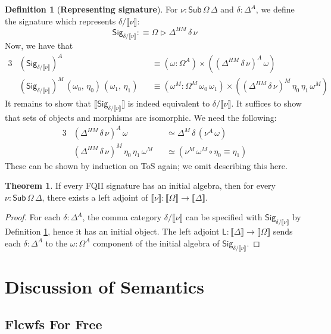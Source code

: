\documentclass[12pt,a4paper,twoside,openany]{book}
\theoremstyle{remark}
\theoremstyle{definition}
\newtheorem{mydefinition}{Definition}
\theoremstyle{theorem}
\newtheorem{theorem}{Theorem}
\newcommand{\ms}[1]{\mathsf{#1}}
\newcommand{\Sub}{\mathsf{Sub}}
\newcommand{\ext}{\triangleright}
\newcommand{\llb}{\llbracket}
\newcommand{\rrb}{\rrbracket}
\newcommand{\sem}[1]{\llb#1\rrb}
\newcommand{\defn}{:\equiv}
\begin{document}
\begin{mydefinition}[\textbf{Representing signature}]
\label{def:fqii-rep-signature}
\noindent For $\nu : \Sub\,\Omega\,\Delta$ and $\delta : \Delta^A$, we define the
signature which represents $\delta/\sem{\nu}$:
\[
  \ms{Sig}_{\delta/\sem{\nu}} \defn \Omega \ext \Delta^{HM}\,\delta\,\nu
\]
Now, we have that
\begin{alignat*}{3}
  &(\ms{Sig}_{\delta/\sem{\nu}})^A &&\equiv (\omega : \Omega^A) \times ((\Delta^{HM}\,\delta\,\nu)^A\,\omega)\\
  &(\ms{Sig}_{\delta/\sem{\nu}})^M\,(\omega_0,\,\eta_0)\,(\omega_1,\,\eta_1) &&\equiv (\omega^M : \Omega^M\,\omega_0\,\omega_1) \times ((\Delta^{HM}\,\delta\,\nu)^M\,\eta_0\,\eta_1\,\omega^M)
\end{alignat*}
It remains to show that $\sem{\ms{Sig}_{\delta/\sem{\nu}}}$ is indeed equivalent
to $\delta/\sem{\nu}$. It suffices to show that sets of objects and morphisms
are isomorphic. We need the following:
\begin{alignat*}{3}
  & (\Delta^{HM}\,\delta\,\nu)^A\,\omega &&\simeq \Delta^M\,\delta\,(\nu^A\,\omega)\\
  & (\Delta^{HM}\,\delta\,\nu)^M\,\eta_0\,\eta_1\,\omega^M &&\simeq (\nu^M\,\omega^M \circ \eta_0 \equiv \eta_1)
\end{alignat*}
These can be shown by induction on ToS again; we omit describing this here.
\end{mydefinition}

\begin{theorem}
If every FQII signature has an initial algebra, then for every $\nu :
\Sub\,\Omega\,\Delta$, there exists a left adjoint of $\sem{\nu} : \sem{\Omega} \to \sem{\Delta}$.
\end{theorem}
\begin{proof}
For each $\delta : \Delta^A$, the comma category $\delta/\sem{\nu}$ can be
specified with $\ms{Sig}_{\delta/\sem{\nu}}$ by Definition
\ref{def:fqii-rep-signature}, hence it has an initial object. The left adjoint
$\ms{L} : \sem{\Delta} \to \sem{\Omega}$ sends each $\delta : \Delta^A$ to the
$\omega : \Omega^A$ component of the initial algebra of
$\ms{Sig}_{\delta/\sem{\nu}}$.
\end{proof}

\section{Discussion of Semantics}

\subsection{Flcwfs For Free}
\end{document}
